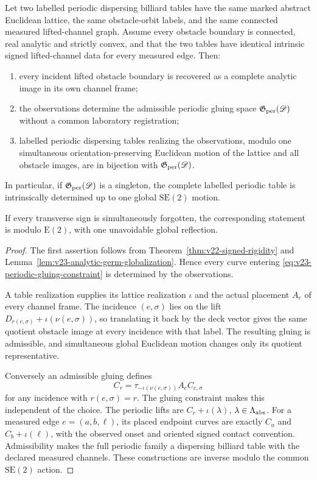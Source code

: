 \begin{theorem}
\label{thm:v23-intrinsic-table-rigidity}
Let two labelled periodic dispersing billiard tables have the same marked
abstract Euclidean lattice, the same obstacle-orbit labels, and the same
connected measured lifted-channel graph.  Assume every obstacle boundary is
connected, real analytic and strictly convex, and that the two tables have
identical intrinsic signed lifted-channel data for every measured edge.  Then:
\begin{enumerate}
\item every incident lifted obstacle boundary is recovered as a complete
analytic image in its own channel frame;
\item the observations determine the admissible periodic gluing space
\(\mathfrak G_{\rm per}(\mathscr D)\) without a common laboratory registration;
\item labelled periodic dispersing tables realizing the observations, modulo
one simultaneous orientation-preserving Euclidean motion of the lattice and
all obstacle images, are in bijection with
\(\mathfrak G_{\rm per}(\mathscr D)\).
\end{enumerate}
In particular, if \(\mathfrak G_{\rm per}(\mathscr D)\) is a singleton, the
complete labelled periodic table is intrinsically determined up to one global
\(\mathrm{SE}(2)\) motion.

If every transverse sign is simultaneously forgotten, the corresponding
statement is modulo \(\mathrm E(2)\), with one unavoidable global reflection.
\end{theorem}

\begin{proof}
The first assertion follows from Theorem~\ref{thm:v22-signed-rigidity} and
Lemma~\ref{lem:v23-analytic-germ-globalization}.  Hence every curve entering
\eqref{eq:v23-periodic-gluing-constraint} is determined by the observations.

A table realization supplies its lattice realization \(\iota\) and the actual
placement \(A_e\) of every channel frame.  The incidence \((e,\sigma)\) lies
on the lift
\(D_{r(e,\sigma)}+\iota(\nu(e,\sigma))\), so translating it back by the deck
vector gives the same quotient obstacle image at every incidence with that
label.  The resulting gluing is admissible, and simultaneous global Euclidean
motion changes only its quotient representative.

Conversely an admissible gluing defines
\[
 C_r=\tau_{-\iota(\nu(e,\sigma))}A_eC_{e,\sigma}
\]
for any incidence with \(r(e,\sigma)=r\).  The gluing constraint makes this
independent of the choice.  The periodic lifts are
\(C_r+\iota(\lambda)\), \(\lambda\in\Lambda_{\rm abs}\).  For a measured edge
\(e=(a,b,\ell)\), its placed endpoint curves are exactly
\(C_a\) and \(C_b+\iota(\ell)\), with the observed onset and oriented signed
contact convention.  Admissibility makes the full periodic family a dispersing
billiard table with the declared measured channels.  These constructions are
inverse modulo the common \(\mathrm{SE}(2)\) action.
\end{proof}

